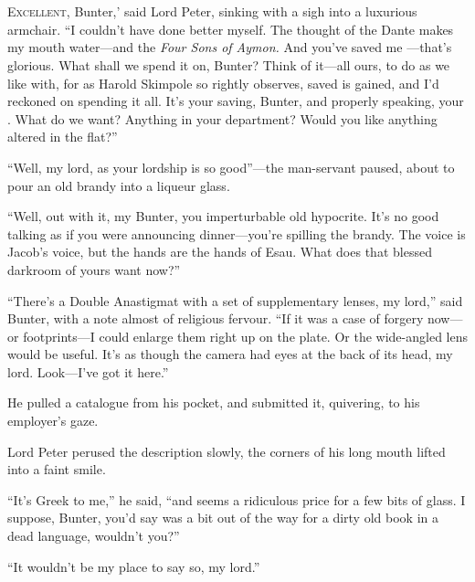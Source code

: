 \chapter[Chapter \thechapter]{}
\lettrine[lines=4,ante=‘]{E}{xcellent}, Bunter,' said Lord Peter, sinking with a sigh into a luxurious armchair. \enquote{I couldn’t have done better myself. The thought of the Dante makes my mouth water\allowbreak---\allowbreak and the \textit{Four Sons of Aymon.} And you’ve saved me \allowbreak---\allowbreak that’s glorious. What shall we spend it on, Bunter? Think of it\allowbreak---\allowbreak all ours, to do as we like with, for as Harold Skimpole so rightly observes,  saved is  gained, and I’d reckoned on spending it all. It’s your saving, Bunter, and properly speaking, your . What do we want? Anything in your department? Would you like anything altered in the flat?}

\enquote{Well, my lord, as your lordship is so good}---the man-servant paused, about to pour an old brandy into a liqueur glass.

\enquote{Well, out with it, my Bunter, you imperturbable old hypocrite. It’s no good talking as if you were announcing dinner\allowbreak---\allowbreak you’re spilling the brandy. The voice is Jacob’s voice, but the hands are the hands of Esau. What does that blessed darkroom of yours want now?}

\enquote{There’s a Double Anastigmat with a set of supplementary lenses, my lord,} said Bunter, with a note almost of religious fervour. \enquote{If it was a case of forgery now\allowbreak---\allowbreak or footprints\allowbreak---\allowbreak I could enlarge them right up on the plate. Or the wide-angled lens would be useful. It’s as though the camera had eyes at the back of its head, my lord. Look\allowbreak---\allowbreak I’ve got it here.}

He pulled a catalogue from his pocket, and submitted it, quivering, to his employer’s gaze.

Lord Peter perused the description slowly, the corners of his long mouth lifted into a faint smile.

\enquote{It’s Greek to me,} he said, \enquote{and  seems a ridiculous price for a few bits of glass. I suppose, Bunter, you’d say  was a bit out of the way for a dirty old book in a dead language, wouldn’t you?}

\enquote{It wouldn’t be my place to say so, my lord.}

